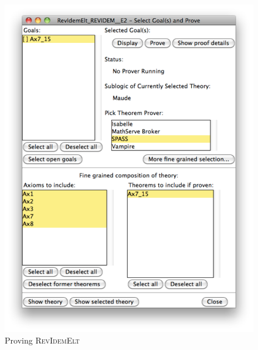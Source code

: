 \documentclass[11pt]{article}
\begin{document}
\begin{figure}
  \begin{minipage}[b]{0.5\textwidth}
    \begin{centering}
      \includegraphics[width=\textwidth]{RevElt-prove.pdf}
      \caption{Proving \textsc{RevIdemElt}}\label{fig:revelt-prove}
    \end{centering}
  \end{minipage}
  \begin{minipage}[b]{0.5\textwidth}
    \begin{centering}

\end{centering}
\end{minipage}
\end{figure}
\end{document}
